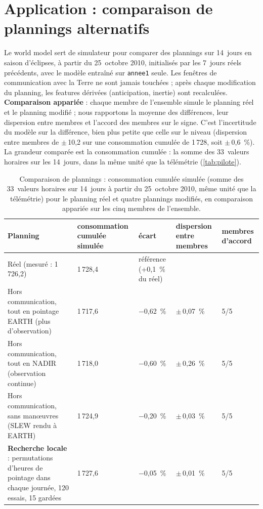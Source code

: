 \documentclass[11pt,a4paper]{article}
\begin{document}
\section{Application : comparaison de plannings alternatifs}\label{sec:pilote}

Le world model sert de simulateur pour comparer des plannings sur 14~jours en saison d'éclipses, à partir du 25~octobre 2010, initialisés par les 7~jours réels précédents, avec le modèle entraîné sur \texttt{annee1} seule. Les fenêtres de communication avec la Terre ne sont jamais touchées ; après chaque modification du planning, les features dérivées (anticipation, inertie) sont recalculées. \textbf{Comparaison appariée} : chaque membre de l'ensemble simule le planning réel et le planning modifié ; nous rapportons la moyenne des différences, leur dispersion entre membres et l'accord des membres sur le signe. C'est l'incertitude du modèle sur la différence, bien plus petite que celle sur le niveau (dispersion entre membres de $\pm$\,10,2 sur une consommation cumulée de 1\,728, soit $\pm$\,0,6~\%). La grandeur comparée est la consommation cumulée : la somme des 33~valeurs horaires sur les 14~jours, dans la même unité que la télémétrie (\autoref{tab:pilote}).

\begin{table}[htbp]
\centering\small
\caption{Comparaison de plannings : consommation cumulée simulée (somme des 33~valeurs horaires sur 14~jours à partir du 25~octobre 2010, même unité que la télémétrie) pour le planning réel et quatre plannings modifiés, en comparaison appariée sur les cinq membres de l'ensemble.}
\label{tab:pilote}
\begin{tabularx}{\textwidth}{Y C{2.4cm} C{2.6cm} C{2.2cm} C{1.7cm}}
\toprule
Planning & consommation cumulée simulée & écart & dispersion entre membres & membres d'accord \\
\midrule
Réel (mesuré : 1\,726,2) & 1\,728,4 & référence (+0,1~\% du réel) & & \\
Hors communication, tout en pointage EARTH (plus d'observation) & 1\,717,6 & $-$0,62~\% & $\pm$\,0,07~\% & 5/5 \\
Hors communication, tout en NADIR (observation continue) & 1\,718,0 & $-$0,60~\% & $\pm$\,0,26~\% & 5/5 \\
Hors communication, sans manœuvres (SLEW rendu à EARTH) & 1\,724,9 & $-$0,20~\% & $\pm$\,0,03~\% & 5/5 \\
\textbf{Recherche locale} : permutations d'heures de pointage dans chaque journée, 120 essais, 15 gardées & 1\,727,6 & $-$0,05~\% & $\pm$\,0,01~\% & 5/5 \\
\bottomrule
\end{tabularx}
\end{table}
\end{document}
